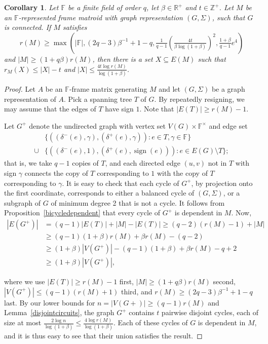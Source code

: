 \documentclass[12pt]{amsart}
\newtheorem{corollary}[theorem]{Corollary}
\theoremstyle{definition}
\newcommand{\bF}{\mathbb F}
\newcommand{\bR}{\mathbb R}
\newcommand{\bZ}{\mathbb Z}
\DeclareMathOperator{\sign}{sign}
\begin{document}
  \begin{corollary}\label{framematroidrankdeficiency}
    Let $\bF$ be a finite field of order $q$, let $\beta \in \bR^+$ and $t \in \bZ^+$. Let $M$ be an $\bF$-represented frame matroid with graph representation $(G,\Sigma)$, such that $G$ is connected. If $M$ satisfies \[r(M) \ge \max\left(|\bF|,(2q-3)\beta^{-1}+1-q,\tfrac{1}{q-1}\left(\tfrac{4t}{\beta\log(1+\beta)}\right)^2,\tfrac{1+\beta}{q-1}e^4\right)\] and $|M| \ge (1+q\beta)r(M)$, then there is a set $X \subseteq E(M)$ such that $r_M(X) \le |X|-t$ and $|X| \le \tfrac{4 t\log r(M)}{\log(1+\beta)}$.
  \end{corollary}
  \begin{proof}
    Let $A$ be an $\bF$-frame matrix generating $M$ and let $(G,\Sigma)$ be a graph representation of $A$. Pick a spanning tree $T$ of $G$. By repeatedly resigning, we may assume that the edges of $T$ have sign $1$. Note that $|E(T)| \geq r(M) - 1$.
    
     Let $G^+$ denote the undirected graph with vertex set $V(G) \times \bF^\times$ and edge set 
     \begin{align*}
      & \{((\delta^{-}(e),\gamma),(\delta^{+}(e),\gamma)): e \in T, \gamma \in \bF\}\\
      \cup & \{((\delta^-(e), 1), (\delta^+(e), \sign(e))): e \in E(G)\setminus T\};
     \end{align*}
      that is, we take $q-1$ copies of $T$, and each directed edge $(u,v)$ not in $T$ with sign $\gamma$ connects the copy of $T$ corresponding to $1$ with the copy of $T$ corresponding to $\gamma$.
It is easy to check that each cycle of $G^+$, by projection onto the first coordinate, corresponds to either a balanced cycle of $(G,\Sigma)$, or a subgraph of $G$ of minimum degree 2 that is not a cycle. It follows from Proposition~\ref{bicycledependent} that every cycle of $G^+$ is dependent in $M$. Now,
\begin{align*}
    |E(G^+)| & = (q-1)|E(T)| + |M| - |E(T)| \geq (q-2)(r(M) - 1) + |M|\\
    & \ge (q-1)(1+\beta)r(M) + \beta r(M) - (q-2)\\
    & \ge (1+\beta)|V(G^+)| - (q-1)(1+\beta) + \beta r(M) - q + 2\\
    &  \ge (1+\beta)|V(G^+)|,  
\end{align*}

     where we use $|E(T)| \geq r(M)-1$ first, $|M| \geq (1+q\beta)r(M)$ second, $|V(G^+)| \le (q-1)(r(M)+1)$ third, and $r(M) \ge (2q-3)\beta^{-1}+1-q$ last. By our lower bounds for $n = |V(G+)| \geq (q-1)r(M)$ and Lemma~\ref{disjointcircuits}, the graph $G^+$ contains $t$ pairwise disjoint cycles, each of size at most $\frac{2\log n}{\log(1+\beta)} \le \frac{4 \log r(M)}{\log(1+\beta)}$. Each of these cycles of $G$ is dependent in $M$, and it is thus easy to see that their union satisfies the result. 
  \end{proof}
  
\end{document}
